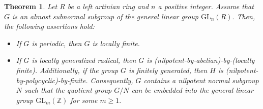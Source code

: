 \documentclass{amsart}
\newtheorem{theorem}{Theorem}[section]
\theoremstyle{definition}
\begin{document}
\begin{theorem}\label{th:5.7} Let $R$ be a left artinian ring and $n$ a positive integer. Assume that $G$ is an almost subnormal subgroup of the general linear group $\mathrm{GL}_n(R).$ Then, the following assertions hold:
\begin{itemize}
\item [(1)] If $G$ is periodic, then $G$ is locally finite.
\item [(2)] If $G$ is locally generalized radical, then $G$ is (nilpotent-by-abelian)-by-(locally finite). Additionally, if the group $G$ is finitely generated, then $H$ is (nilpotent-by-polycyclic)-by-finite. Consequently, $G$ contains a nilpotent normal subgroup $N$ such that the quotient group $G/N$ can be embedded into the general linear group $\mathrm{GL}_m(\mathbb{Z})$ for some $m\geq 1.$
\end{itemize}	
\end{theorem}
\end{document}
